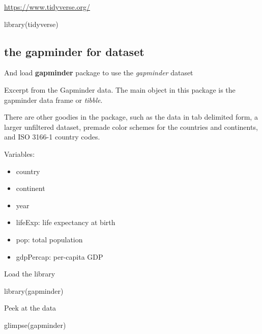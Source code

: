 \documentclass[
]{book}
\makeatletter
\newenvironment{Shaded}{\begin{snugshade}}{\end{snugshade}}
\newcommand{\FunctionTok}[1]{\textcolor[rgb]{0,0,0}{#1}}
\newcommand{\NormalTok}[1]{#1}
\providecommand{\tightlist}{%
  \setlength{\itemsep}{0pt}\setlength{\parskip}{0pt}}
\newenvironment{kframe}{%
\medskip{}
\setlength{\fboxsep}{.8em}
 \def\at@end@of@kframe{}%
 \ifinner\ifhmode%
  \def\at@end@of@kframe{\end{minipage}}%
  \begin{minipage}{\columnwidth}%
 \fi\fi%
 \def\FrameCommand##1{\hskip\@totalleftmargin \hskip-\fboxsep
 \colorbox{shadecolor}{##1}\hskip-\fboxsep
     \hskip-\linewidth \hskip-\@totalleftmargin \hskip\columnwidth}%
 \MakeFramed {\advance\hsize-\width
   \@totalleftmargin\z@ \linewidth\hsize
   \@setminipage}}%
 {\par\unskip\endMakeFramed%
 \at@end@of@kframe}
\renewenvironment{Shaded}{\begin{kframe}}{\end{kframe}}
\makeatother
\begin{document}
\url{https://www.tidyverse.org/}

\begin{Shaded}
\begin{Highlighting}[]
\FunctionTok{library}\NormalTok{(tidyverse)}
\end{Highlighting}
\end{Shaded}

\hypertarget{the-gapminder-for-dataset}{%
\subsection{\texorpdfstring{the \textbf{gapminder} for dataset}{the gapminder for dataset}}\label{the-gapminder-for-dataset}}

And load \textbf{gapminder} package to use the \emph{gapminder} dataset

Excerpt from the Gapminder data. The main object in this package is the gapminder data frame or \emph{tibble}.

There are other goodies in the package, such as the data in tab delimited form, a larger unfiltered dataset, premade color schemes for the countries and continents, and ISO 3166-1 country codes.

Variables:

\begin{itemize}
\tightlist
\item
  country
\item
  continent
\item
  year
\item
  lifeExp: life expectancy at birth
\item
  pop: total population
\item
  gdpPercap: per-capita GDP
\end{itemize}

Load the library

\begin{Shaded}
\begin{Highlighting}[]
\FunctionTok{library}\NormalTok{(gapminder)}
\end{Highlighting}
\end{Shaded}

Peek at the data

\begin{Shaded}
\begin{Highlighting}[]
\FunctionTok{glimpse}\NormalTok{(gapminder)}
\end{Highlighting}
\end{Shaded}
\end{document}
